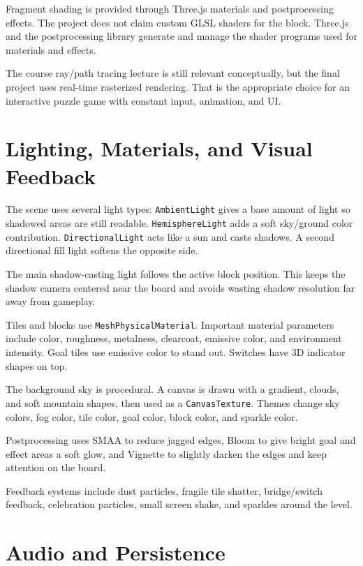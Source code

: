 \documentclass[11pt,a4paper]{article}
\newcommand{\code}[1]{\texttt{#1}}
\begin{document}
Fragment shading is provided through Three.js materials and postprocessing effects. The project does not claim custom GLSL shaders for the block. Three.js and the postprocessing library generate and manage the shader programs used for materials and effects.

The course ray/path tracing lecture is still relevant conceptually, but the final project uses real-time rasterized rendering. That is the appropriate choice for an interactive puzzle game with constant input, animation, and UI.

\section{Lighting, Materials, and Visual Feedback}

The scene uses several light types:
\code{AmbientLight} gives a base amount of light so shadowed areas are still readable.
\code{HemisphereLight} adds a soft sky/ground color contribution.
\code{DirectionalLight} acts like a sun and casts shadows.
A second directional fill light softens the opposite side.

The main shadow-casting light follows the active block position. This keeps the shadow camera centered near the board and avoids wasting shadow resolution far away from gameplay.

Tiles and blocks use \code{MeshPhysicalMaterial}. Important material parameters include color, roughness, metalness, clearcoat, emissive color, and environment intensity. Goal tiles use emissive color to stand out. Switches have 3D indicator shapes on top.

The background sky is procedural. A canvas is drawn with a gradient, clouds, and soft mountain shapes, then used as a \code{CanvasTexture}. Themes change sky colors, fog color, tile color, goal color, block color, and sparkle color.

Postprocessing uses SMAA to reduce jagged edges, Bloom to give bright goal and effect areas a soft glow, and Vignette to slightly darken the edges and keep attention on the board.

Feedback systems include dust particles, fragile tile shatter, bridge/switch feedback, celebration particles, small screen shake, and sparkles around the level.

\section{Audio and Persistence}
\end{document}
